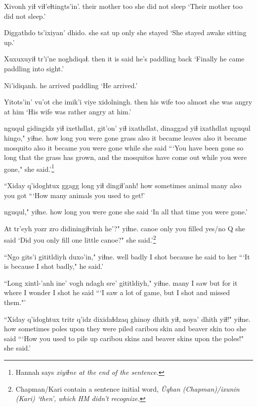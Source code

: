 \documentclass[12pt]{article}
\begin{document}
\gll Xivonh yiɬ viɬ'eɬtingts'in'.
{their mother} too {she did not sleep}
\glt `Their mother too did not sleep.'
\glend 

\gll Diggathdo ts'ixiyan' dhido.
{she sat up} only {she stayed}
\glt `She stayed awake sitting up.'
\glend 

\gll Xuxuxuyiɬ tr'i'ne noghdiqaɬ.
then  {it is said} {he's paddling back}
\glt `Finally he came paddling into sight.'
\glend 

\gll Ni'idiqanh.
{{he arrived paddling}}
\glt `He arrived.'
\glend 

\gll Yitots'in' vu'ot  che imik'i  {viye xidolningh.}
then  {his wife} too almost {she was angry at him}
\glt `His wife was rather angry at him.'
\glend 

 nguqul  gidingidz yiɬ ixethdlat, git'on' yiɬ ixathdlat, dinaggad yiɬ ixathdlat nguqul  hingo," yiɬne.
{how long}   {you were gone}  grass  also {it became} leaves  also {it became} mosquito also {it became} {you were gone} while  {she said}
\glt ```You have been gone so long that the grass has grown, and the mosquitos have come out while you were gone," she said.'\footnote{Hannah says \em xiyiɬne \em at the end of the sentence.}
\glend 

\gll ``Xiday q'idoghtux ggagg  long yiɬ dingiɬ'anh!
how  sometimes animal many also {you got}
\glt ```How many animals you used to get!'
\glend 

 nguqul," yiɬne.
{how long} {you were gone} {she said}
\glt `In all that time you were gone.'
\glend 

\gll At {tr'eyh yozr} zro didiningiɬvinh he'?" yiɬne.
{} canoe only {you filled} {yes/no Q}  {she said}
\glt `Did you only fill one little canoe?" she said.'\footnote{Chapman/Kari contain a sentence initial word, \em \^U\textceltpal qhan (Chapman)/\em ixunin \em (Kari) `then', which HM didn't recognize.}
\glend 

\gll ``Ngo gits'i gititldiyh duxo'in," yiɬne.
well badly {I shot} because {he said to her}
\glt ```It is because I shot badly," he said.'
\glend 

\gll ``Long xintl-'anh ine' vogh ndagh sre' gititldiyh," yiɬne.
many  {I saw}  but {for it} where {I wonder} {I shot} {he said}
\glt ```I saw a lot of game, but I shot and missed them."'
\glend 

\gll ``Xiday q'idoghtux tritr q'idz dixidaɬdzaq ghinoy dhith yiɬ, noya' dhith yiɬ!" yiɬne.
how  sometimes poles upon {they were piled} caribou skin and beaver skin too {she said}
\glt ```How you used to pile up caribou skins and beaver skins upon the poles!" she said.'
\glend 
\end{document}
